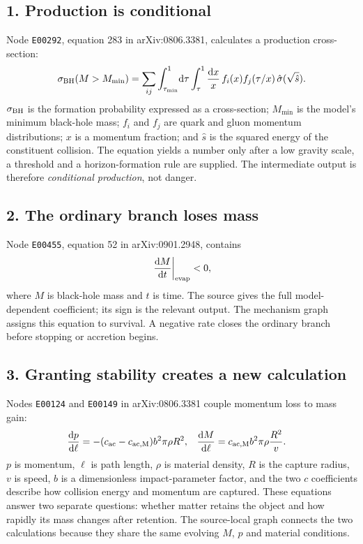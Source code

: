 \documentclass[10pt]{article}
\newcommand{\ud}{\mathrm{d}}
\begin{document}
\subsection*{1. Production is conditional}

Node \texttt{E00292}, equation 283 in arXiv:0806.3381, calculates a production cross-section:
\begin{equation}
\sigma_{\rm BH}(M>M_{\min})=
\sum_{ij}\int_{\tau_{\min}}^1\!\ud\tau
\int_\tau^1\frac{\ud x}{x}\,f_i(x)f_j(\tau/x)\,
\hat\sigma(\sqrt{\hat s}).
\label{eq:production}
\end{equation}
$\sigma_{\rm BH}$ is the formation probability expressed as a cross-section; $M_{\min}$ is the model's minimum black-hole mass; $f_i$ and $f_j$ are quark and gluon momentum distributions; $x$ is a momentum fraction; and $\hat s$ is the squared energy of the constituent collision. The equation yields a number only after a low gravity scale, a threshold and a horizon-formation rule are supplied. The intermediate output is therefore \emph{conditional production}, not danger.

\subsection*{2. The ordinary branch loses mass}

Node \texttt{E00455}, equation 52 in arXiv:0901.2948, contains
\begin{equation}
\left.\frac{\ud M}{\ud t}\right|_{\rm evap}<0,
\label{eq:evap}
\end{equation}
where $M$ is black-hole mass and $t$ is time. The source gives the full model-dependent coefficient; its sign is the relevant output. The mechanism graph assigns this equation to survival. A negative rate closes the ordinary branch before stopping or accretion begins.

\subsection*{3. Granting stability creates a new calculation}

Nodes \texttt{E00124} and \texttt{E00149} in arXiv:0806.3381 couple momentum loss to mass gain:
\begin{align}
\frac{\ud p}{\ud\ell}&=-(c_{\rm ac}-c_{\rm ac,M})b^2\pi\rho R^2,
&
\frac{\ud M}{\ud\ell}&=c_{\rm ac,M}b^2\pi\rho\frac{R^2}{v}.
\label{eq:stopping-growth}
\end{align}
$p$ is momentum, $\ell$ is path length, $\rho$ is material density, $R$ is the capture radius, $v$ is speed, $b$ is a dimensionless impact-parameter factor, and the two $c$ coefficients describe how collision energy and momentum are captured. These equations answer two separate questions: whether matter retains the object and how rapidly its mass changes after retention. The source-local graph connects the two calculations because they share the same evolving $M$, $p$ and material conditions.
\end{document}
